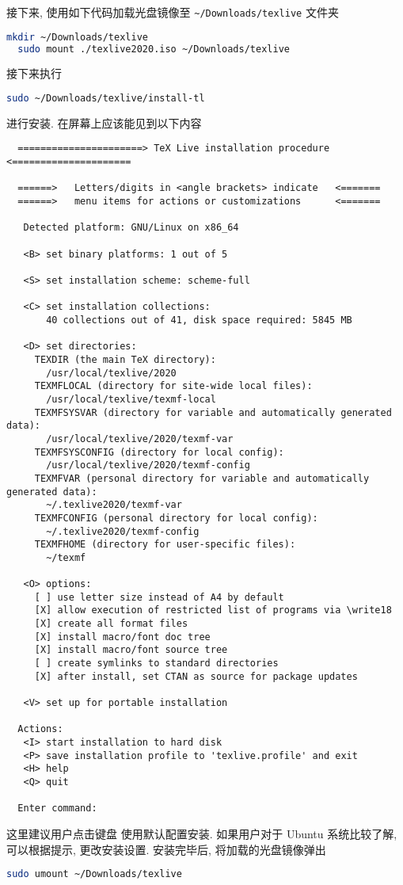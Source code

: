 接下来, 使用如下代码加载光盘镜像至 \texttt{\~{}/Downloads/texlive} 文件夹
\begin{lstlisting}[language = bash]
  mkdir ~/Downloads/texlive
  sudo mount ./texlive2020.iso ~/Downloads/texlive
\end{lstlisting}
接下来执行
\begin{lstlisting}[language = bash]
  sudo ~/Downloads/texlive/install-tl
\end{lstlisting}
进行安装.
在屏幕上应该能见到以下内容
\begin{lstlisting}
  ======================> TeX Live installation procedure <=====================
  
  ======>   Letters/digits in <angle brackets> indicate   <=======
  ======>   menu items for actions or customizations      <=======
  
   Detected platform: GNU/Linux on x86_64
   
   <B> set binary platforms: 1 out of 5
  
   <S> set installation scheme: scheme-full
  
   <C> set installation collections:
       40 collections out of 41, disk space required: 5845 MB
  
   <D> set directories:
     TEXDIR (the main TeX directory):
       /usr/local/texlive/2020
     TEXMFLOCAL (directory for site-wide local files):
       /usr/local/texlive/texmf-local
     TEXMFSYSVAR (directory for variable and automatically generated data):
       /usr/local/texlive/2020/texmf-var
     TEXMFSYSCONFIG (directory for local config):
       /usr/local/texlive/2020/texmf-config
     TEXMFVAR (personal directory for variable and automatically generated data):
       ~/.texlive2020/texmf-var
     TEXMFCONFIG (personal directory for local config):
       ~/.texlive2020/texmf-config
     TEXMFHOME (directory for user-specific files):
       ~/texmf
  
   <O> options:
     [ ] use letter size instead of A4 by default
     [X] allow execution of restricted list of programs via \write18
     [X] create all format files
     [X] install macro/font doc tree
     [X] install macro/font source tree
     [ ] create symlinks to standard directories
     [X] after install, set CTAN as source for package updates
  
   <V> set up for portable installation
  
  Actions:
   <I> start installation to hard disk
   <P> save installation profile to 'texlive.profile' and exit
   <H> help
   <Q> quit
  
  Enter command: 
\end{lstlisting}
这里建议用户点击键盘  使用默认配置安装.
如果用户对于 Ubuntu 系统比较了解, 可以根据提示, 更改安装设置.
安装完毕后, 将加载的光盘镜像弹出
\begin{lstlisting}[language = bash]
  sudo umount ~/Downloads/texlive
\end{lstlisting}

